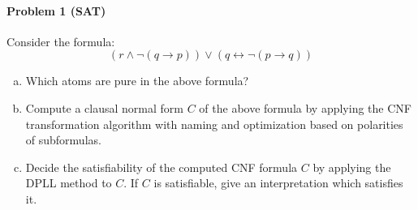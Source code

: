 \paragraph{Problem 1 (SAT)}
    Consider the formula:
    \[
        ( r \land \lnot ( q \rightarrow p ) ) \lor ( q \leftrightarrow \lnot ( p \rightarrow q ) )
    \]
    \begin{enumerate}[(a)]
        \item
            Which atoms are pure in the above formula?
        \item\label{subtask:sat-cnf}
            Compute a clausal normal form $C$ of the above formula by
            applying the CNF transformation algorithm with naming and
            optimization based on polarities of subformulas.
        \item
            Decide the satisfiability of the computed CNF formula $C$
            by applying the DPLL method to $C$. If $C$ is
            satisfiable, give an interpretation which
            satisfies it.
    \end{enumerate}

